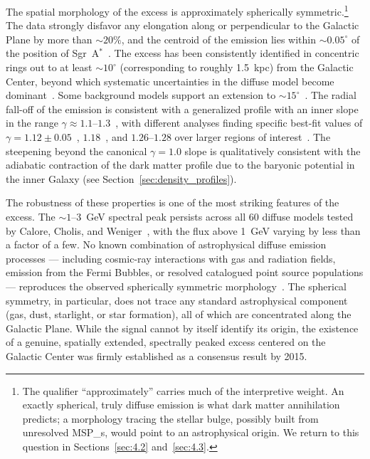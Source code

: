 The spatial morphology of the excess is approximately spherically symmetric.\footnote{The qualifier ``approximately'' carries much of the interpretive weight. An exactly spherical, truly diffuse emission is what dark matter annihilation predicts; a morphology tracing the stellar bulge, possibly built from unresolved \glspl{MSP_}, would point to an astrophysical origin. We return to this question in Sections~\ref{sec:4.2} and~\ref{sec:4.3}.}
The data strongly disfavor any elongation along or perpendicular to the Galactic Plane by more than $\sim 20\%$, and the centroid of the emission lies within $\sim 0.05^\circ$ of the position of Sgr~A$^*$~\cite{Daylan:2014rsa}.
The excess has been consistently identified in concentric rings out to at least $\sim 10^\circ$ (corresponding to roughly 1.5~kpc) from the Galactic Center, beyond which systematic uncertainties in the diffuse model become dominant~\cite{Daylan:2014rsa,Calore:2014xka}.
Some background models support an extension to $\sim 15^\circ$~\cite{Calore:2014xka}.
The radial fall-off of the emission is consistent with a generalized \NFW profile with an inner slope in the range $\gamma \approx 1.1$--$1.3$~\cite{Daylan:2014rsa,Abazajian:2012pn,Abazajian:2014fta,Calore:2014xka}, with different analyses finding specific best-fit values of $\gamma = 1.12 \pm 0.05$~\cite{Abazajian:2014fta}, $1.18$~\cite{Daylan:2014rsa}, and $1.26$--$1.28$ over larger regions of interest~\cite{Daylan:2014rsa}.
The steepening beyond the canonical $\gamma = 1.0$ \NFW slope is qualitatively consistent with the adiabatic contraction of the dark matter profile due to the baryonic potential in the inner Galaxy (see Section~\ref{sec:density_profiles}).

The robustness of these properties is one of the most striking features of the excess.
The $\sim 1$--$3$~GeV spectral peak persists across all 60 diffuse models tested by Calore, Cholis, and Weniger~\cite{Calore:2014xka}, with the flux above 1~GeV varying by less than a factor of a few.
No known combination of astrophysical diffuse emission processes --- including cosmic-ray interactions with gas and radiation fields, emission from the Fermi Bubbles, or resolved catalogued point source populations --- reproduces the observed spherically symmetric morphology~\cite{Daylan:2014rsa}.
The spherical symmetry, in particular, does not trace any standard astrophysical component (gas, dust, starlight, or star formation), all of which are concentrated along the Galactic Plane.
While the signal cannot by itself identify its origin, the existence of a genuine, spatially extended, spectrally peaked excess centered on the Galactic Center was firmly established as a consensus result by 2015.

